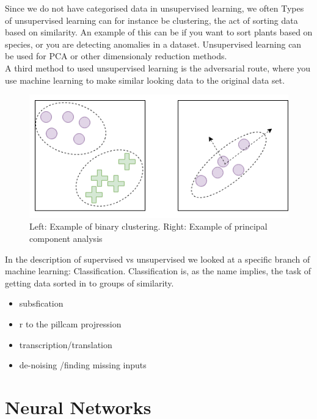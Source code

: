 	Since we do not have categorised data in unsupervised learning, we often %
	Types of unsupervised learning can for instance be clustering, the act of sorting data based on similarity. An example of this can be if you want to sort plants based on species, or 
	you are detecting anomalies in a dataset.
	Unsupervised learning can be used for PCA %
	or other dimensionaly reduction methods.\\
	  
	A third method to used unsupervised learning is the adversarial route, where you use machine learning to make similar looking data to the original data set. 
	    
	\begin{figure}
	    \centering
	    \includegraphics[scale=0.5]{figures/cluster_pca.png}
	    \caption{Left: Example of binary clustering. Right: Example of principal component analysis} 
	\end{figure}

	 
	In the description of supervised vs unsupervised we looked at a specific branch of machine learning: Classification. Classification is, as the name implies, the task of 
	getting data sorted in to groups of similarity. 
	  
	  
	\begin{itemize}
	    \item subsfication
	    \item r to the pillcam projression 
	    \item transcription/translation
	    \item de-noising /finding missing inputs
	\end{itemize}
	  
   
	  

	
\section{Neural Networks}
	  

